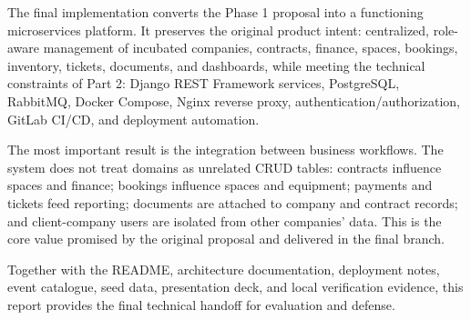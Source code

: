 \documentclass[12pt,a4paper]{report}
\begin{document}
The final implementation converts the Phase 1 proposal into a functioning
microservices platform. It preserves the original product intent: centralized,
role-aware management of incubated companies, contracts, finance, spaces,
bookings, inventory, tickets, documents, and dashboards, while meeting the
technical constraints of Part 2: Django REST Framework services, PostgreSQL,
RabbitMQ, Docker Compose, Nginx reverse proxy, authentication/authorization,
GitLab CI/CD, and deployment automation.

The most important result is the integration between business workflows. The
system does not treat domains as unrelated CRUD tables: contracts influence
spaces and finance; bookings influence spaces and equipment; payments and
tickets feed reporting; documents are attached to company and contract records;
and client-company users are isolated from other companies' data. This is the
core value promised by the original proposal and delivered in the final branch.

Together with the README, architecture documentation, deployment notes, event
catalogue, seed data, presentation deck, and local verification evidence, this
report provides the final technical handoff for evaluation and defense.
\end{document}
